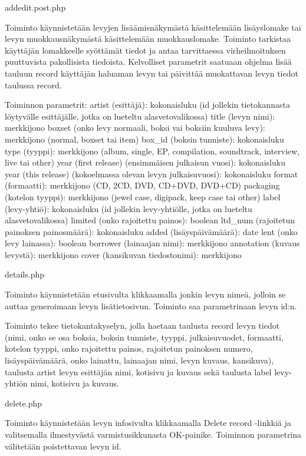\documentclass[a4paper,12pt]{report}
\begin{document}
addedit.post.php

Toiminto käynnistetään levyjen lisäämisnäkymästä käsittelemään lisäyslomake tai levyn muokkausnäkymästä käsittelemään muokkauslomake. 
Toiminto tarkistaa käyttäjän lomakkeelle syöttämät tiedot ja antaa tarvittaessa virheilmoituksen puuttuvista pakollisista tiedoista. 
Kelvolliset parametrit saatuaan ohjelma lisää tauluun record käyttäjän haluaman levyn tai päivittää muokattavan levyn tiedot taulussa record.

Toiminnon parametrit:
	artist (esittäjä): kokonaisluku (id jollekin tietokannasta löytyvälle esittäjälle, jotka on lueteltu alasvetovalikossa)
	title (levyn nimi): merkkijono
	boxset (onko levy normaali, boksi vai boksiin kuuluva levy): merkkijono (normal, boxset tai item)
	box_id (boksin tunniste): kokonaisluku
	type (tyyppi): merkkijono (album, single, EP, compilation, soundtrack, interview, live tai other)
	year (first release) (ensimmäisen julkaisun vuosi): kokonaisluku
	year (this release) (kokoelmassa olevan levyn julkaisuvuosi): kokonaisluku
	format (formaatti): merkkijono (CD, 2CD, DVD, CD+DVD, DVD+CD)
	packaging (kotelon tyyppi): merkkijono (jewel case, digipack, keep case tai other)
	label (levy-yhtiö): kokonaisluku (id jollekin levy-yhtiölle, jotka on lueteltu alasvetovalikossa)
	limited (onko rajoitettu painos): boolean
	ltd_num (rajoitetun painoksen painosmäärä): kokonaisluku
	added (lisäyspäivämäärä): date
	lent (onko levy lainassa): boolean
	borrower (lainaajan nimi): merkkijono
	annotation (kuvaus levystä): merkkijono
	cover (kansikuvan tiedostonimi): merkkijono


details.php

Toiminto käynnistetään etusivulta klikkaamalla jonkin levyn nimeä, jolloin se auttaa generoimaan levyn lisätietosivun. 
Toiminto saa parametrinaan levyn id:n.

Toiminto tekee tietokantakyselyn, jolla haetaan taulusta record levyn tiedot (nimi, onko se osa boksia, boksin tunniste, tyyppi, julkaisuvuodet, formaatti, 
kotelon tyyppi, onko rajoitettu painos, rajoitetun painoksen numero, lisäyspäivämäärä, onko lainattu, lainaajan nimi, levyn kuvaus, kansikuva), 
taulusta artist levyn esittäjän nimi, kotisivu ja kuvaus sekä taulusta label levy-yhtiön nimi, kotisivu ja kuvaus.


delete.php

Toiminto käynnistetään levyn infosivulta klikkaamalla Delete record -linkkiä ja valitsemalla ilmestyvästä varmistusikkunasta OK-painike. Toiminnon parametrina välitetään poistettavan levyn id.
\end{document}
